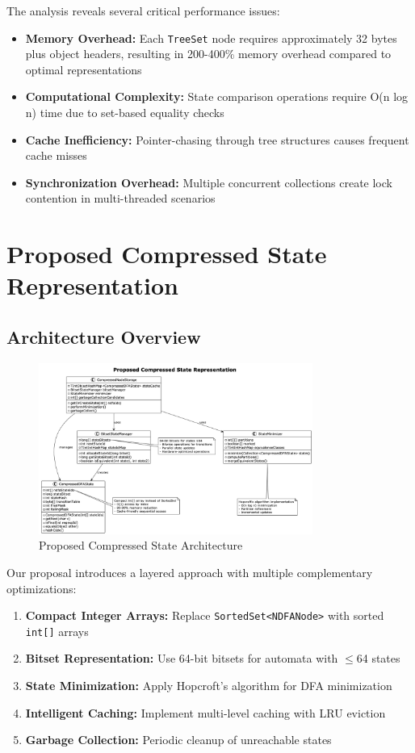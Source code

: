 \documentclass[11pt,a4paper]{article}
\begin{document}
The analysis reveals several critical performance issues:

\begin{itemize}
    \item \textbf{Memory Overhead:} Each \texttt{TreeSet} node requires approximately 32 bytes plus object headers, resulting in 200-400\% memory overhead compared to optimal representations
    \item \textbf{Computational Complexity:} State comparison operations require O(n log n) time due to set-based equality checks
    \item \textbf{Cache Inefficiency:} Pointer-chasing through tree structures causes frequent cache misses
    \item \textbf{Synchronization Overhead:} Multiple concurrent collections create lock contention in multi-threaded scenarios
\end{itemize}

\section{Proposed Compressed State Representation}

\subsection{Architecture Overview}

\begin{figure}[H]
\centering
\includegraphics[width=0.8\textwidth]{illustrations/proposed_compressed_states.png}
\caption{Proposed Compressed State Architecture}
\label{fig:proposed}
\end{figure}

Our proposal introduces a layered approach with multiple complementary optimizations:

\begin{enumerate}
    \item \textbf{Compact Integer Arrays:} Replace \texttt{SortedSet<NDFANode>} with sorted \texttt{int[]} arrays
    \item \textbf{Bitset Representation:} Use 64-bit bitsets for automata with $\leq$64 states  
    \item \textbf{State Minimization:} Apply Hopcroft's algorithm for DFA minimization
    \item \textbf{Intelligent Caching:} Implement multi-level caching with LRU eviction
    \item \textbf{Garbage Collection:} Periodic cleanup of unreachable states
\end{enumerate}
\end{document}
